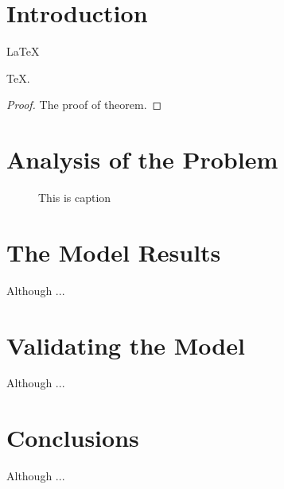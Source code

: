 \section{Introduction}
\begin{Theorem} \label{thm:latex}
    \LaTeX
\end{Theorem}
\begin{Lemma} \label{thm:tex}
    \TeX .
\end{Lemma}
\begin{proof}
    The proof of theorem.
\end{proof}


\section{Analysis of the Problem}
\begin{figure}[h]
  \small
  \centering
  \caption{This is caption}
  \label{fig:one_figure}
\end{figure}


\section{The Model Results}
Although ...


\section{Validating the Model}
Although ...


\section{Conclusions}
Although ...


